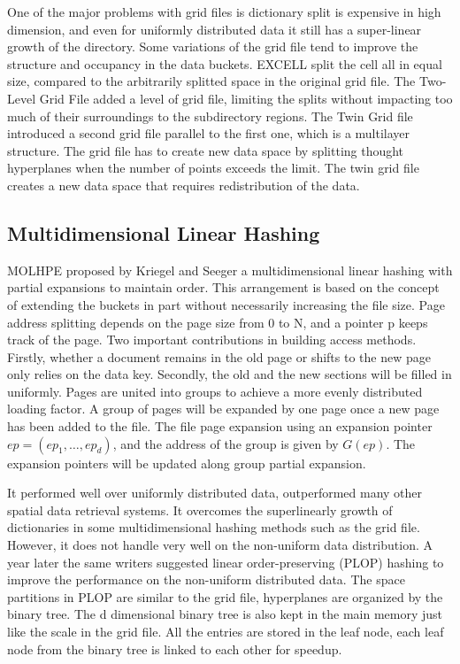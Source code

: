 One of the major problems with grid files is dictionary split is expensive in high dimension, and even for uniformly distributed data it still has a super-linear growth of the directory. Some variations of the grid file tend to improve the structure and occupancy in the data buckets. EXCELL split the cell all in equal size, compared to the arbitrarily splitted space in the original grid file. The Two-Level Grid File added a level of grid file, limiting the splits without impacting too much of their surroundings to the subdirectory regions. The Twin Grid file introduced a second grid file parallel to the first one, which is a multilayer structure. The grid file has to create new data space by splitting thought hyperplanes when the number of points exceeds the limit. The twin grid file creates a new data space that requires redistribution of the data. 


\subsection{Multidimensional Linear Hashing}
MOLHPE proposed by Kriegel and Seeger \cite{Kriegel:vw} a multidimensional linear hashing with partial expansions to maintain order. This arrangement is based on the concept of extending the buckets in part without necessarily increasing the file size. Page address splitting depends on the page size from 0 to N, and a pointer p keeps track of the page. Two important contributions in building access methods. Firstly, whether a document remains in the old page or shifts to the new page only relies on the data key. Secondly, the old and the new sections will be filled in uniformly. Pages are united into groups to achieve a more evenly distributed loading factor. A group of pages will be expanded by one page once a new page has been added to the file. The file page expansion using an expansion pointer ${ep = (ep_1, \dots, ep_d)}$, and the address of the group is given by ${G(ep)}$. The expansion pointers will be updated along group partial expansion. 

It performed well over uniformly distributed data, outperformed many other spatial data retrieval systems. It overcomes the superlinearly growth of dictionaries in some multidimensional hashing methods such as the grid file. However, it does not handle very well on the non-uniform data distribution. A year later the same writers suggested linear order-preserving (PLOP) hashing to improve the performance on the non-uniform distributed data. The space partitions in PLOP are similar to the grid file, hyperplanes are organized by the binary tree. The d dimensional binary tree is also kept in the main memory just like the scale in the grid file. All the entries are stored in the leaf node, each leaf node from the binary tree is linked to each other for speedup.  




